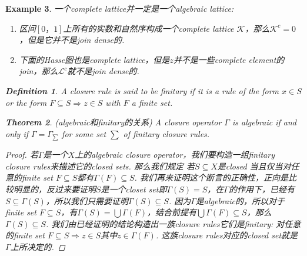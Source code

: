 \documentclass{article}
\newtheorem{theorem}{Theorem}[section]
\newtheorem{example}[theorem]{Example}
\newtheorem{definition}[theorem]{Definition}
\newcommand\lattice{\mathcal{L}}
\begin{document}
\begin{example}
\rm 一个complete lattice并一定是一个algebraic lattice:
\begin{enumerate}
	\item 区间$[0，1]$上所有的实数和自然序构成一个complete lattice $\mathcal{K}$，那么$\mathcal{K}^c = {0}$，但是它并不是join dense的. 
	\item 下面的Hasse图也是complete lattice，但是$z$并不是一些complete element的join，那么$\lattice ^c$就不是join dense的.
	\begin{center}
	\end{center}
\end{enumerate}

\begin{definition}
\rm A closure rule is said to be {\color{red} finitary} if it is a rule of the form $x \in S$ or the form $F \subseteq S \Rightarrow  z \in S$ with $F$ a finite set.
\end{definition}

\begin{theorem}
\rm {\color{red} (algebraic和finitary的关系)} A closure operator $\Gamma$ is algebraic if and only if $\Gamma = \Gamma_{\sum}$ for some set $\sum$ of finitary closure rules.
\end{theorem}

\begin{proof}
若$\Gamma$是一个$X$上的algebraic closure operator，我们要构造一组finitary closure rules来描述它的closed sets. 那么我们规定 {\color{red} 若$S \subseteq X$是closed 当且仅当对任意的finite set $F \subseteq S$都有$\Gamma(F) \subseteq S$}. 我们再来证明这个断言的正确性，正向是比较明显的，反过来要证明$S$是一个closet set即$\Gamma(S) = S$，在$\Gamma$的作用下，已经有$S \subseteq \Gamma(S)$，所以我们只需要证明$\Gamma(S) \subseteq S$. 因为$\Gamma$是algebraic的，所以对于finite set $F \subseteq S$，有$\Gamma(S) = \bigcup \Gamma(F)$，结合前提有$\bigcup \Gamma(F) \subseteq S$，那么$\Gamma(S) \subseteq S$. 我们由已经证明的结论构造出一族closure rules它们是finitary: 对任意的finite set $F \subseteq S \Rightarrow z \in S$其中$z \in \Gamma(F)$. 这族closure rules对应的closed set就是$\Gamma$上所决定的. 


\end{proof}
\end{example}
\end{document}
